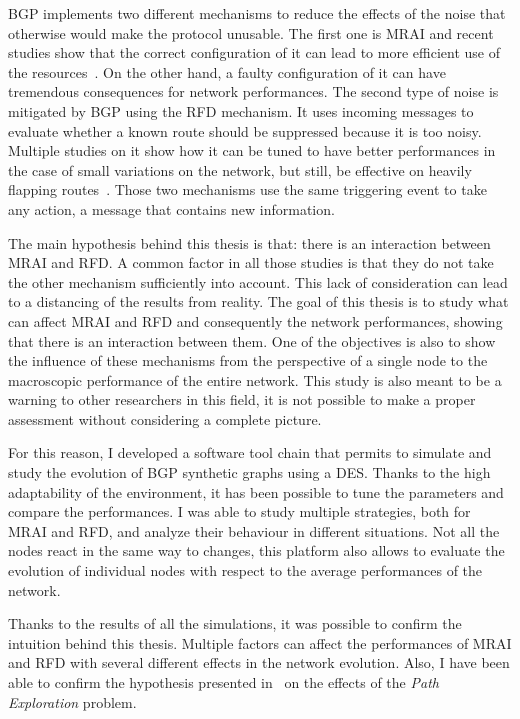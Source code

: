 \ac{BGP} implements two different mechanisms to reduce the effects of the
noise that otherwise would make the protocol unusable.
The first one is \ac{MRAI} and recent studies show that the correct
configuration of it can lead to more efficient use of the
resources~\cite{griffin2001experimental,fabrikant2011there,deshpande2004impact,milani2020improving}.
On the other hand, a faulty configuration of it can have tremendous consequences
for network performances.
The second type of noise is mitigated by \ac{BGP} using the \ac{RFD} mechanism.
It uses incoming messages to evaluate whether a known route should
be suppressed because it is too noisy.
Multiple studies on it show how it can be tuned to have better performances in
the case of small variations on the network, but still, be effective on heavily
flapping routes~\cite{mao2002route,gray2020bgp,rfc7196}.
Those two mechanisms use the same triggering event to take any action,
a message that contains new information.

The main hypothesis behind this thesis is that: there is an interaction
between \ac{MRAI} and \ac{RFD}.
A common factor in all those studies is that they do not take the other
mechanism sufficiently into account.
This lack of consideration can lead to a distancing of the results from
reality.
The goal of this thesis is to study what can affect \ac{MRAI} and \ac{RFD}
and consequently the network performances, showing that there is an interaction
between them.
One of the objectives is also to show the influence of these mechanisms from
the perspective of a single node to the macroscopic performance of the
entire network.
This study is also meant to be a warning to other researchers in this field, it
is not possible to make a proper assessment without considering a complete picture.

For this reason, I developed a software tool chain that permits to simulate and
study the evolution of \ac{BGP} synthetic graphs using a \ac{DES}.
Thanks to the high adaptability of the environment, it has been possible to tune
the parameters and compare the performances.
I was able to study multiple strategies, both for \ac{MRAI} and \ac{RFD}, and
analyze their behaviour in different situations.
Not all the nodes react in the same way to changes, this
platform also allows to evaluate the evolution of individual nodes
with respect to the average performances of the network.

Thanks to the results of all the simulations, it was possible to confirm
the intuition behind this thesis.
Multiple factors can affect the performances of \ac{MRAI} and \ac{RFD} with
several different effects in the network evolution.
Also, I have been able to confirm the hypothesis presented in~\cite{griffinFSM,fabrikant2011there}
on the effects of the \textit{Path Exploration} problem.


